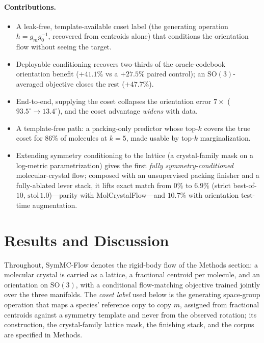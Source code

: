 \documentclass[journal=acsodf,manuscript=article]{achemso}
\begin{document}
\paragraph{Contributions.}
\begin{itemize}\itemsep0.05em
\item A leak-free, template-available coset label (the generating operation
$h=g_mg_0^{-1}$, recovered from centroids alone) that conditions the orientation
flow without seeing the target.
\item Deployable conditioning recovers two-thirds of the oracle-codebook
orientation benefit ($+41.1\%$ vs a $+27.5\%$ paired control); an
$\mathrm{SO}(3)$-averaged objective closes the rest ($+47.7\%$).
\item End-to-end, supplying the coset collapses the orientation error $7\times$
($93.5^\circ\!\to\!13.4^\circ$), and the coset advantage \emph{widens} with data.
\item A template-free path: a packing-only predictor whose top-$k$ covers the true
coset for $86\%$ of molecules at $k{=}5$, made usable by top-$k$ marginalization.
\item Extending symmetry conditioning to the lattice (a crystal-family mask on a
log-metric parametrization) gives the first \emph{fully symmetry-conditioned}
molecular-crystal flow; composed with an unsupervised packing finisher and a
fully-ablated lever stack, it lifts exact match from $0\%$ to $6.9\%$ (strict
best-of-$10$, $\text{stol}\,1.0$)---parity with MolCrystalFlow---and $10.7\%$ with
orientation test-time augmentation.
\end{itemize}

\section{Results and Discussion}
Throughout, SymMC-Flow denotes the rigid-body flow of the Methods section: a
molecular crystal is carried as a lattice, a fractional centroid per molecule, and
an orientation on $\mathrm{SO}(3)$, with a conditional flow-matching objective
trained jointly over the three manifolds. The \emph{coset label} used below is the
generating space-group operation that maps a species' reference copy to copy $m$,
assigned from fractional centroids against a symmetry template and never from the
observed rotation; its construction, the crystal-family lattice mask, the finishing
stack, and the corpus are specified in Methods.
\end{document}
